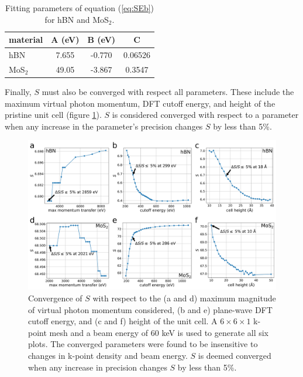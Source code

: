 \documentclass{article}
\begin{document}
\begin{table} \centering 
  \begin{tabular}{lccc}
    \toprule
    material &A (eV) &B (eV) &C \\
    \midrule
    hBN     &7.655 &-0.770 &0.06526 \\
    MoS$_2$ &49.05 &-3.867 &0.3547 \\
    \bottomrule
  \end{tabular}
  \caption{
    Fitting parameters of equation (\ref{eq:SEb}) for hBN and MoS$_2$.
  } 
\label{tab:fit}
\end{table}

Finally, $S$ must also be converged with respect all parameters.  These include
the maximum virtual photon momentum, DFT cutoff energy, and height of the
pristine unit cell (figure \ref{fig:convergences}).
$S$ is considered converged with respect to a parameter when any increase in
the parameter's precision changes $S$ by less than 5\%.

\begin{figure}[H]
  \centering
  \includegraphics[width=\textwidth]{figS4.pdf}
  \caption{
    Convergence of $S$ with respect to the (a and d) maximum magnitude of
    virtual photon momentum considered, (b and e) plane-wave DFT cutoff energy,
    and (c and f) height of the unit cell.
    A $6\times6\times1$ k-point mesh and a beam energy of 60 keV is used to
    generate all six plots.
    The converged parameters were found to be insensitive to changes in k-point
    density and beam energy.
    $S$ is deemed converged when any increase in precision changes $S$ by less
    than 5\%.
  }
  \label{fig:convergences}
\end{figure}
\break

\pagebreak
\end{document}
